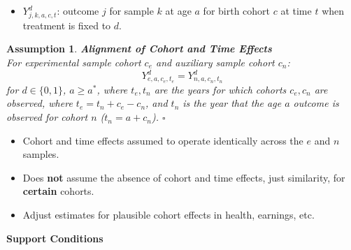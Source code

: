 \documentclass[static]{JJH-Beamer}
\newtheorem{assumption}{Assumption}
\begin{document}
\begin{frame}

\begin{itemize}
\item $Y_{j,k,a,c,t}^d$: outcome $j$ for sample $k$ at age $a$ for birth cohort $c$ at time $t$ when treatment is fixed to $d$.
\end{itemize}

\begin{assumption}\label{ass:alignment} \textbf{Alignment of Cohort and Time Effects}\\
For experimental sample cohort $c_{e}$ and auxiliary sample cohort $c_{n}$:
\begin{equation}
Y_{e,a,c_{e},t_{e}}^d = Y_{n,a,c_{n},t_{n}}^d
\end{equation}
for $d \in \{ 0, 1\}$, $a \geq a^*$, where $t_{e}, t_{n}$ are the years for which cohorts $c_{e}, c_{n}$ are observed, where $t_e = t_n + c_e - c_n$, and $t_n$ is the year that the age $a$ outcome is observed for cohort $n$ ($t_n = a + c_n$). $\square$
\end{assumption}


\end{frame}


\begin{itemize}
\item Cohort and time effects assumed to operate identically across the $e$ and $n$ samples.
\item Does \textbf{not} assume the absence of cohort and time effects, just similarity, for \textbf{certain} cohorts.
\item Adjust estimates for plausible cohort effects in health, earnings, etc.
\end{itemize}

\begin{frame}

\begin{center}
\textbf{Support Conditions}
\end{center}

\end{frame}
\end{document}
